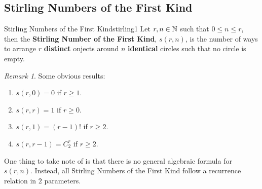 \documentclass[math]{amznotes}
\theoremstyle{remark}
\newtheorem*{remark}{Remark}
\begin{document}
\subsection{Stirling Numbers of the First Kind}
\begin{dfnbox}{Stirling Numbers of the First Kind}{stirling1}
    Let $r, n \in \mathbb{N}$ such that $0 \leq n \leq r$, then the {\color{red} \textbf{Stirling Number of the First Kind}}, $s(r, n)$, is the number of ways to arrange $r$ {\color{red} \textbf{distinct}} onjects around $n$ {\color{red} \textbf{identical}} circles such that no circle is empty.
\end{dfnbox}
\begin{notebox}
    \begin{remark}
        Some obvious results:
        \begin{enumerate}
            \item $s(r, 0) = 0$ if $r \geq 1$.
            \item $s(r, r) = 1$ if $r \geq 0$.
            \item $s(r, 1) = (r - 1)!$ if $r \geq 2$.
            \item $s(r, r - 1) = C^r_2$ if $r \geq 2$.
        \end{enumerate}
    \end{remark}
\end{notebox}
One thing to take note of is that there is no general algebraic formula for $s(r, n)$. Instead, all Stirling Numbers of the First Kind follow a recurrence relation in $2$ parameters.
\end{document}
